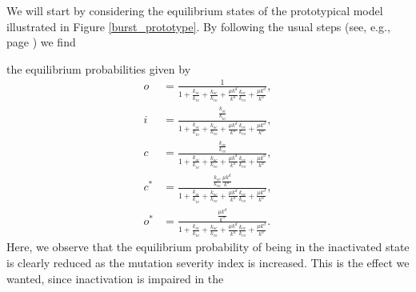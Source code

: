 We will start by considering the equilibrium states of the prototypical
model illustrated in Figure \ref{burst_prototype}. By following the usual steps
(see, e.g., page \pageref{9001}) we find
\begin{comment}
The equilibrium solutions are characterized by
the system of equations
\begin{align}
k_{io}i  &  =k_{oi}o,\text{ }k_{ci}c=k_{ic}i,\text{ }k_{co}c=k_{oc}o,\\
\mu k^{d}c  &  =k^{u}c^{\ast},\text{ }\mu k^{d}o=k^{u}o^{\ast}.
\end{align}
As usual, all variables can be expressed in terms of the open probability,
\begin{equation}
i=\frac{k_{oi}}{k_{io}}o,\text{ }c=\frac{k_{oc}}{k_{co}}o,\text{ }c^{\ast
}=\frac{\mu k^{d}}{k^{u}}\frac{k_{oc}}{k_{co}}o,\text{ }o^{\ast}=\frac{\mu
k^{d}}{k^{u}}o,
\end{equation}
and, since $o+i+c+c^{\ast}+o^{\ast}=1,$ we have
\begin{equation}
\left(  1+\frac{k_{oi}}{k_{io}}+\frac{k_{oc}}{k_{co}}+\frac{\mu k^{d}}{k^{u}
}\frac{k_{oc}}{k_{co}}+\frac{\mu k^{d}}{k^{u}}\right)  o=1
\end{equation}
and therefore
\end{comment}
 the equilibrium probabilities given by
\begin{align}
o  &  =\frac{1}{1+\frac{k_{oi}}{k_{io}}+\frac{k_{oc}}{k_{co}}+\frac{\mu k^{d}
}{k^{u}}\frac{k_{oc}}{k_{co}}+\frac{\mu k^{d}}{k^{u}}},\\
i  &  =\frac{\frac{k_{oi}}{k_{io}}}{1+\frac{k_{oi}}{k_{io}}+\frac{k_{oc}
}{k_{co}}+\frac{\mu k^{d}}{k^{u}}\frac{k_{oc}}{k_{co}}+\frac{\mu k^{d}}{k^{u}
}},\\
c  &  =\frac{\frac{k_{oc}}{k_{co}}}{1+\frac{k_{oi}}{k_{io}}+\frac{k_{oc}
}{k_{co}}+\frac{\mu k^{d}}{k^{u}}\frac{k_{oc}}{k_{co}}+\frac{\mu k^{d}}{k^{u}
}},\\
c^{\ast}  &  =\frac{\frac{k_{oc}}{k_{co}}\frac{\mu k^{d}}{k^{u}}}
{1+\frac{k_{oi}}{k_{io}}+\frac{k_{oc}}{k_{co}}+\frac{\mu k^{d}}{k^{u}}
\frac{k_{oc}}{k_{co}}+\frac{\mu k^{d}}{k^{u}}},\\
o^{\ast}  &  =\frac{\frac{\mu k^{d}}{k^{u}}}{1+\frac{k_{oi}}{k_{io}}
+\frac{k_{oc}}{k_{co}}+\frac{\mu k^{d}}{k^{u}}\frac{k_{oc}}{k_{co}}+\frac{\mu
k^{d}}{k^{u}}}.
\end{align}
Here, we observe that the equilibrium probability of being in the inactivated
state is clearly reduced as the mutation severity index is increased. This is
the effect we wanted, since inactivation is impaired in the
